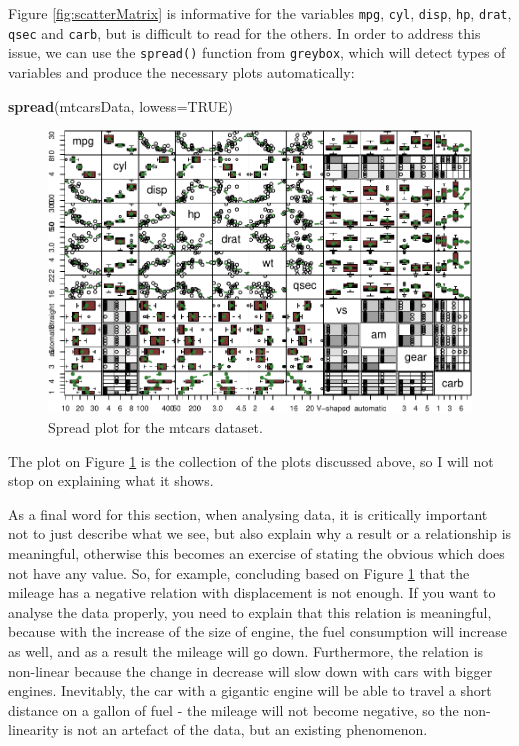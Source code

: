 \documentclass[
]{book}
\newenvironment{Shaded}{\begin{snugshade}}{\end{snugshade}}
\newcommand{\AttributeTok}[1]{\textcolor[rgb]{0.13,0.29,0.53}{#1}}
\newcommand{\ConstantTok}[1]{\textcolor[rgb]{0.56,0.35,0.01}{#1}}
\newcommand{\FunctionTok}[1]{\textcolor[rgb]{0.13,0.29,0.53}{\textbf{#1}}}
\newcommand{\NormalTok}[1]{#1}
\theoremstyle{definition}
\theoremstyle{definition}
\theoremstyle{definition}
\theoremstyle{definition}
\theoremstyle{remark}
\begin{document}
Figure \ref{fig:scatterMatrix} is informative for the variables \texttt{mpg}, \texttt{cyl}, \texttt{disp}, \texttt{hp}, \texttt{drat}, \texttt{qsec} and \texttt{carb}, but is difficult to read for the others. In order to address this issue, we can use the \texttt{spread()} function from \texttt{greybox}, which will detect types of variables and produce the necessary plots automatically:

\begin{Shaded}
\begin{Highlighting}[]
\FunctionTok{spread}\NormalTok{(mtcarsData, }\AttributeTok{lowess=}\ConstantTok{TRUE}\NormalTok{)}
\end{Highlighting}
\end{Shaded}

\begin{figure}
\centering
\includegraphics{Svetunkov---Statistics-for-Business-Analytics_files/figure-latex/spreadPlot-1.pdf}
\caption{\label{fig:spreadPlot}Spread plot for the mtcars dataset.}
\end{figure}

The plot on Figure \ref{fig:spreadPlot} is the collection of the plots discussed above, so I will not stop on explaining what it shows.

As a final word for this section, when analysing data, it is critically important not to just describe what we see, but also explain why a result or a relationship is meaningful, otherwise this becomes an exercise of stating the obvious which does not have any value. So, for example, concluding based on Figure \ref{fig:spreadPlot} that the mileage has a negative relation with displacement is not enough. If you want to analyse the data properly, you need to explain that this relation is meaningful, because with the increase of the size of engine, the fuel consumption will increase as well, and as a result the mileage will go down. Furthermore, the relation is non-linear because the change in decrease will slow down with cars with bigger engines. Inevitably, the car with a gigantic engine will be able to travel a short distance on a gallon of fuel - the mileage will not become negative, so the non-linearity is not an artefact of the data, but an existing phenomenon.
\end{document}
